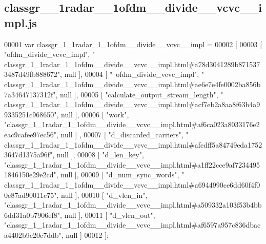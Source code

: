 \subsection{classgr\+\_\+\_\+1radar\+\_\+\_\+1ofdm\+\_\+\+\_\+divide\+\_\+\+\_\+vcvc\+\_\+\+\_\+impl.\+js}
\label{classgr__1__1radar__1__1ofdm____divide____vcvc____impl_8js_source}

\begin{DoxyCode}
00001 var classgr_1_1radar_1_1ofdm__divide__vcvc__impl =
00002 [
00003     [ \textcolor{stringliteral}{"ofdm\_divide\_vcvc\_impl"}, \textcolor{stringliteral}{"
      classgr\_1\_1radar\_1\_1ofdm\_\_divide\_\_vcvc\_\_impl.html#a78d3041289b8715373487d49fb888672"}, null ],
00004     [ \textcolor{stringliteral}{"~ofdm\_divide\_vcvc\_impl"}, \textcolor{stringliteral}{"
      classgr\_1\_1radar\_1\_1ofdm\_\_divide\_\_vcvc\_\_impl.html#ae6e7e4fe0002ba856b7a34647137312f"}, null ],
00005     [ \textcolor{stringliteral}{"calculate\_output\_stream\_length"}, \textcolor{stringliteral}{"
      classgr\_1\_1radar\_1\_1ofdm\_\_divide\_\_vcvc\_\_impl.html#acf7eb2a8aa8f63b4a99335251c968650"}, null ],
00006     [ \textcolor{stringliteral}{"work"}, \textcolor{stringliteral}{"classgr\_1\_1radar\_1\_1ofdm\_\_divide\_\_vcvc\_\_impl.html#af6ca023a8033176e2eac9cafee97ec56"}, null ]
      ,
00007     [ \textcolor{stringliteral}{"d\_discarded\_carriers"}, \textcolor{stringliteral}{"
      classgr\_1\_1radar\_1\_1ofdm\_\_divide\_\_vcvc\_\_impl.html#afedff5a84749eda17523647d1375a96f"}, null ],
00008     [ \textcolor{stringliteral}{"d\_len\_key"}, \textcolor{stringliteral}{"classgr\_1\_1radar\_1\_1ofdm\_\_divide\_\_vcvc\_\_impl.html#a1ff22cce9af72344951846150e29e2cd"}, 
      null ],
00009     [ \textcolor{stringliteral}{"d\_num\_sync\_words"}, \textcolor{stringliteral}{"
      classgr\_1\_1radar\_1\_1ofdm\_\_divide\_\_vcvc\_\_impl.html#a6944990ce6dd60f4f00e87ad90011c75"}, null ],
00010     [ \textcolor{stringliteral}{"d\_vlen\_in"}, \textcolor{stringliteral}{"classgr\_1\_1radar\_1\_1ofdm\_\_divide\_\_vcvc\_\_impl.html#a509332a103f53b4bb6dd31a0b7906ef8"}, 
      null ],
00011     [ \textcolor{stringliteral}{"d\_vlen\_out"}, \textcolor{stringliteral}{"classgr\_1\_1radar\_1\_1ofdm\_\_divide\_\_vcvc\_\_impl.html#af6597a957c836dbaca4402b9c20c7ddb"}, 
      null ]
00012 ];
\end{DoxyCode}
